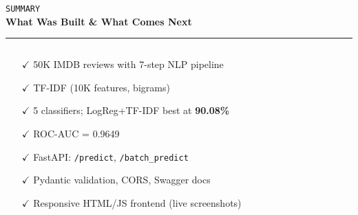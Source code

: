 \documentclass[aspectratio=169,10pt]{beamer}
\begin{document}
{
\begin{frame}[plain]


\vspace{0.2cm}
\begin{center}
  {\color{primarylt}\scriptsize\texttt{SUMMARY}}\\[5pt]
  {\color{white}\Large\bfseries What Was Built \& What Comes Next}\\[5pt]
  \textcolor{accent}{\rule{9cm}{1.5pt}}
\end{center}

\vspace{0.2cm}
\begin{columns}[T]
  \begin{tcolorbox}[enhanced,
      colback=white!8!primary,colframe=white!30,
      arc=5pt,boxrule=0.6pt,
      title={\small\bfseries Project Deliverables},
      coltitle=white,
      top=4pt,bottom=4pt,left=6pt,right=6pt]
    \color{primarylt}\scriptsize
    \begin{itemize}\setlength\itemsep{2pt}
      \item[\textcolor{accent}{$\checkmark$}]
        50K IMDB reviews with 7-step NLP pipeline
      \item[\textcolor{accent}{$\checkmark$}]
        TF-IDF (10K features, bigrams)
      \item[\textcolor{accent}{$\checkmark$}]
        5 classifiers; LogReg+TF-IDF best at \textbf{90.08\%}
      \item[\textcolor{accent}{$\checkmark$}]
        ROC-AUC = 0.9649
      \item[\textcolor{accent}{$\checkmark$}]
        FastAPI: \texttt{/predict}, \texttt{/batch\_predict}
      \item[\textcolor{accent}{$\checkmark$}]
        Pydantic validation, CORS, Swagger docs
      \item[\textcolor{accent}{$\checkmark$}]
        Responsive HTML/JS frontend (live screenshots)
    \end{itemize}
  \end{tcolorbox}


\end{columns}
\end{frame}}
\end{document}
